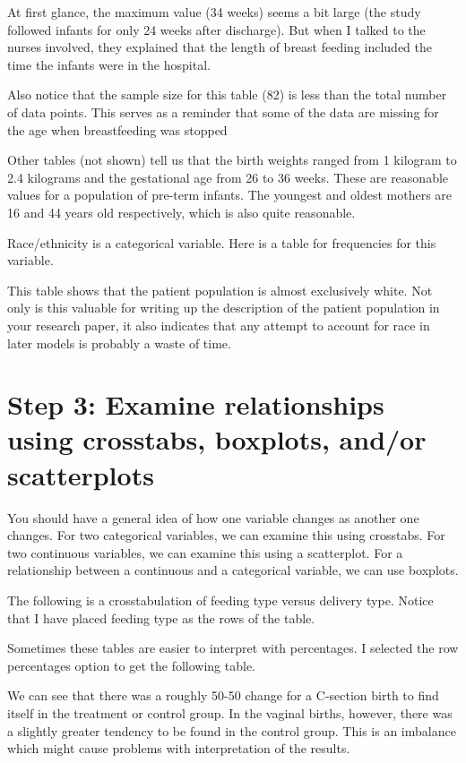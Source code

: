\documentclass[
  letterpaper,
  DIV=11,
  numbers=noendperiod]{scrreprt}
\begin{document}
\begin{tcolorbox}
At first glance, the maximum value (34 weeks) seems a bit large (the
study followed infants for only 24 weeks after discharge). But when I
talked to the nurses involved, they explained that the length of breast
feeding included the time the infants were in the hospital.

Also notice that the sample size for this table (82) is less than the
total number of data points. This serves as a reminder that some of the
data are missing for the age when breastfeeding was stopped

Other tables (not shown) tell us that the birth weights ranged from 1
kilogram to 2.4 kilograms and the gestational age from 26 to 36 weeks.
These are reasonable values for a population of pre-term infants. The
youngest and oldest mothers are 16 and 44 years old respectively, which
is also quite reasonable.

Race/ethnicity is a categorical variable. Here is a table for
frequencies for this variable.

This table shows that the patient population is almost exclusively
white. Not only is this valuable for writing up the description of the
patient population in your research paper, it also indicates that any
attempt to account for race in later models is probably a waste of time.

\section{Step 3: Examine relationships using crosstabs, boxplots, and/or
scatterplots}\label{step-3-examine-relationships-using-crosstabs-boxplots-andor-scatterplots}

You should have a general idea of how one variable changes as another
one changes. For two categorical variables, we can examine this using
crosstabs. For two continuous variables, we can examine this using a
scatterplot. For a relationship between a continuous and a categorical
variable, we can use boxplots.

The following is a crosstabulation of feeding type versus delivery type.
Notice that I have placed feeding type as the rows of the table.

Sometimes these tables are easier to interpret with percentages. I
selected the row percentages option to get the following table.

We can see that there was a roughly 50-50 change for a C-section birth
to find itself in the treatment or control group. In the vaginal births,
however, there was a slightly greater tendency to be found in the
control group. This is an imbalance which might cause problems with
interpretation of the results.


\end{tcolorbox}
\end{document}

